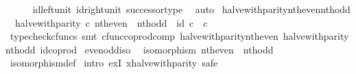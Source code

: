 \begin{isabellebody}
\ \ \ \ \isamarkupfalse%
\ id{\isacharunderscore}{\kern0pt}left{\isacharunderscore}{\kern0pt}unit{}\ id{\isacharunderscore}{\kern0pt}right{\isacharunderscore}{\kern0pt}unit{}\ successor{\isacharunderscore}{\kern0pt}type\ \isamarkupfalse%
\ auto\isanewline
{}\isamarkupfalse%
%
\endisatagproof
{\isafoldproof}%
%
\isadelimproof
\isanewline
%
\endisadelimproof
\isanewline
{}\isamarkupfalse%
\ halve{\isacharunderscore}{\kern0pt}with{\isacharunderscore}{\kern0pt}parity{\isacharunderscore}{\kern0pt}nth{\isacharunderscore}{\kern0pt}even{\isacharunderscore}{\kern0pt}nth{\isacharunderscore}{\kern0pt}odd{\isacharcolon}{\kern0pt}\isanewline
\ \ {\isachardoublequoteopen}halve{\isacharunderscore}{\kern0pt}with{\isacharunderscore}{\kern0pt}parity\ {\isasymcirc}\isactrlsub c\ {\isacharparenleft}{\kern0pt}nth{\isacharunderscore}{\kern0pt}even\ {\isasymamalg}\ nth{\isacharunderscore}{\kern0pt}odd{\isacharparenright}{\kern0pt}\ {\isacharequal}{\kern0pt}\ id\ {\isacharparenleft}{\kern0pt}{\isasymnat}\isactrlsub c\ {\isasymCoprod}\ {\isasymnat}\isactrlsub c{\isacharparenright}{\kern0pt}{\isachardoublequoteclose}\isanewline
%
\isadelimproof
\ \ %
\endisadelimproof
%
\isatagproof
{}\isamarkupfalse%
\ {\isacharparenleft}{\kern0pt}typecheck{\isacharunderscore}{\kern0pt}cfuncs{\isacharcomma}{\kern0pt}\ smt\ cfunc{\isacharunderscore}{\kern0pt}coprod{\isacharunderscore}{\kern0pt}comp\ halve{\isacharunderscore}{\kern0pt}with{\isacharunderscore}{\kern0pt}parity{\isacharunderscore}{\kern0pt}nth{\isacharunderscore}{\kern0pt}even\ halve{\isacharunderscore}{\kern0pt}with{\isacharunderscore}{\kern0pt}parity{\isacharunderscore}{\kern0pt}nth{\isacharunderscore}{\kern0pt}odd\ id{\isacharunderscore}{\kern0pt}coprod{\isacharparenright}{\kern0pt}%
\endisatagproof
{\isafoldproof}%
%
\isadelimproof
\isanewline
%
\endisadelimproof
\isanewline
{}\isamarkupfalse%
\ even{\isacharunderscore}{\kern0pt}odd{\isacharunderscore}{\kern0pt}iso{\isacharcolon}{\kern0pt}\isanewline
\ \ {\isachardoublequoteopen}isomorphism\ {\isacharparenleft}{\kern0pt}nth{\isacharunderscore}{\kern0pt}even\ {\isasymamalg}\ nth{\isacharunderscore}{\kern0pt}odd{\isacharparenright}{\kern0pt}{\isachardoublequoteclose}\isanewline
%
\isadelimproof
\ \ %
\endisadelimproof
%
\isatagproof
{}\isamarkupfalse%
\ isomorphism{\isacharunderscore}{\kern0pt}def\isanewline
{}\isamarkupfalse%
\ {\isacharparenleft}{\kern0pt}intro\ exI{\isacharbrackleft}{\kern0pt}\ x{\isacharequal}{\kern0pt}halve{\isacharunderscore}{\kern0pt}with{\isacharunderscore}{\kern0pt}parity{\isacharbrackright}{\kern0pt}{\isacharcomma}{\kern0pt}\ safe{\isacharparenright}{\kern0pt}\isanewline

\end{isabellebody}
